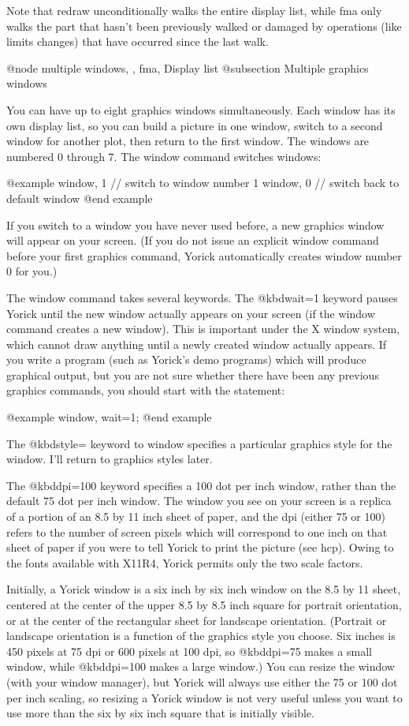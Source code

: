Note that redraw unconditionally walks the entire display list, while
fma only walks the part that hasn't been previously walked or damaged
by operations (like limits changes) that have occurred since the last
walk.

@node multiple windows,  , fma, Display list
@subsection Multiple graphics windows

You can have up to eight graphics windows simultaneously.  Each window
has its own display list, so you can build a picture in one window,
switch to a second window for another plot, then return to the first
window.  The windows are numbered 0 through 7.  The window command
switches windows:

@example
window, 1       // switch to window number 1
window, 0       // switch back to default window
@end example

If you switch to a window you have never used before, a new graphics
window will appear on your screen.  (If you do not issue an explicit
window command before your first graphics command, Yorick
automatically creates window number 0 for you.)

The window command takes several keywords.  The @kbd{wait=1} keyword
pauses Yorick until the new window actually appears on your screen (if
the window command creates a new window).  This is important under the X
window system, which cannot draw anything until a newly created window
actually appears.  If you write a program (such as Yorick's demo
programs) which will produce graphical output, but you are not sure
whether there have been any previous graphics commands, you should start
with the statement:

@example
window, wait=1;
@end example

The @kbd{style=} keyword to window specifies a particular graphics style
for the window.  I'll return to graphics styles later.

The @kbd{dpi=100} keyword specifies a 100 dot per inch window, rather
than the default 75 dot per inch window.  The window you see on your
screen is a replica of a portion of an 8.5 by 11 inch sheet of paper,
and the dpi (either 75 or 100) refers to the number of screen pixels
which will correspond to one inch on that sheet of paper if you were to
tell Yorick to print the picture (see hcp).  Owing to the fonts
available with X11R4, Yorick permits only the two scale factors.

Initially, a Yorick window is a six inch by six inch window on the 8.5
by 11 sheet, centered at the center of the upper 8.5 by 8.5 inch square
for portrait orientation, or at the center of the rectangular sheet for
landscape orientation.  (Portrait or landscape orientation is a function
of the graphics style you choose.  Six inches is 450 pixels at 75 dpi or
600 pixels at 100 dpi, so @kbd{dpi=75} makes a small window, while
@kbd{dpi=100} makes a large window.)  You can resize the window (with
your window manager), but Yorick will always use either the 75 or 100
dot per inch scaling, so resizing a Yorick window is not very useful
unless you want to use more than the six by six inch square that is
initially visible.

